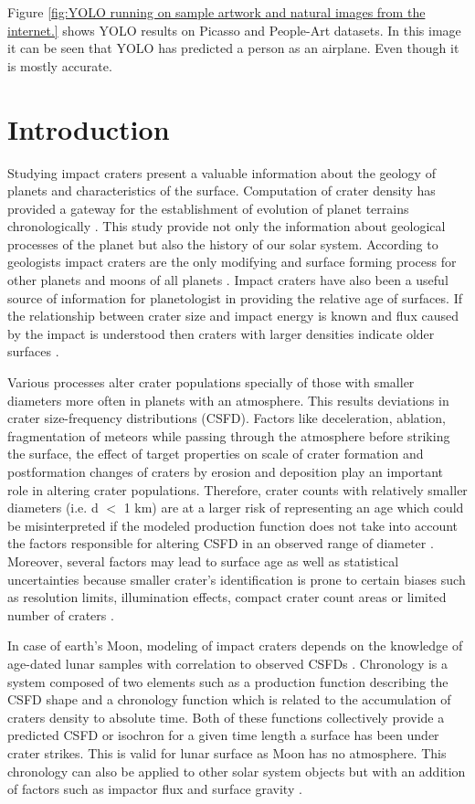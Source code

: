 \documentclass[11pt]{article}
\begin{document}
Figure \ref{fig:YOLO running on sample artwork and natural images from the internet.} shows YOLO results on Picasso and People-Art datasets. In this image it can be seen that YOLO has predicted a person as an airplane. Even though it is mostly accurate.
\fi

\section{Introduction}
Studying impact craters present a valuable information about the geology of planets and characteristics of the surface. Computation of crater density has provided a gateway for the establishment of evolution of planet terrains chronologically \cite{martins2009crater}. This study provide not only the information about geological processes of the planet but also the history of our solar system. According to geologists impact craters are the only modifying and surface forming process for other planets and moons of all planets \cite{koeberl1994african}. Impact craters have also been a useful source of information for planetologist in providing the relative age of surfaces. If the relationship between crater size and impact energy is known and flux caused by the impact is understood then craters with larger densities indicate older surfaces \cite{ivanov2002comparison}.

Various processes alter crater populations specially of those with smaller diameters \cite{opik1965mariner} more often in planets with an atmosphere. This results deviations in crater size-frequency distributions (CSFD). Factors like deceleration, ablation, fragmentation of meteors while passing through the atmosphere before striking the surface, the effect of target properties on scale of crater formation and postformation changes of craters by erosion and deposition play an important role in altering crater populations. Therefore, crater counts with relatively smaller diameters (i.e. d $<$ 1 km) are at a larger risk of representing an age which could be misinterpreted if the modeled production function does not take into account the factors responsible for altering CSFD in an observed range of diameter \cite{hartmann1981chronology}. Moreover, several factors may lead to surface age as well as statistical uncertainties because smaller crater's identification is prone to certain biases such as resolution limits, illumination effects, compact crater count areas or limited number of craters \cite{soderblom1970distribution}.

In case of earth's Moon, modeling of impact craters depends on the knowledge of age-dated lunar samples with correlation to observed CSFDs \cite{williams2018dating}. Chronology is a system composed of two elements such as a production function describing the CSFD shape and a chronology function which is related to the accumulation of craters density to absolute time. Both of these functions collectively provide a predicted CSFD or isochron for a given time length a surface has been under crater strikes. This is valid for lunar surface as Moon has no atmosphere. This chronology can also be applied to other solar system objects but with an addition of factors such as impactor flux and surface gravity \cite{ivanov2002comparison}.
\end{document}
